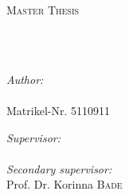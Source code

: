 \documentclass[
11pt, %
oneside, %
english, %
singlespacing, %
headsepline, %
chapterinoneline, %
]{MastersDoctoralThesis} %
\author{Serhii \textsc{Hamotskyi}} %
\begin{document}
\frontmatter %

\pagestyle{plain} %


\begin{titlepage}
\begin{center}

\vspace*{.06\textheight}
{\scshape\LARGE \univname\par}\vspace{1.5cm} %
\textsc{\Large Master Thesis}\\[0.5cm] %

\HRule \\[0.4cm] %
{\huge \bfseries \ttitle\par}\vspace{0.4cm} %
\HRule \\[1.5cm] %
 
\begin{minipage}[t]{0.4\textwidth}
\begin{flushleft} \large
\emph{Author:}\\
{\authorname \\
Matrikel-Nr. 5110911
} \\ 
\end{flushleft}
\end{minipage}
\begin{minipage}[t]{0.4\textwidth}
\begin{flushright} \large
\emph{Supervisor:} \\
{\supname} %
\\ 
\vspace{5mm}
\emph{Secondary supervisor:} \\
{Prof. Dr. Korinna \textsc{Bade}} %
\end{flushright}
\end{minipage}\\[3cm]
 

\end{center}
\end{titlepage}
\end{document}
